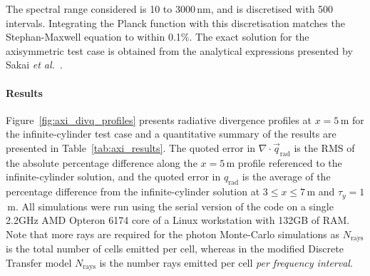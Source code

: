 The spectral range considered is 10 to 3000\,nm, and is discretised with 500 intervals.
Integrating the Planck function with this discretisation matches the Stephan-Maxwell equation to within 0.1\%.
The exact solution for the axisymmetric test case is obtained from the analytical expressions presented by Sakai \textit{et al.}~\cite{SSM1998}.

\paragraph{Results}

Figure~\ref{fig:axi_divq_profiles} presents radiative divergence profiles at $x=5$\,m for the infinite-cylinder test case and a quantitative summary of the results are presented in Table~\ref{tab:axi_results}.
The quoted error in $\nabla \cdot \vec{q}_\text{rad}$ is the RMS of the absolute percentage difference along the $x=5$\,m profile referenced to the infinite-cylinder solution, and the quoted error in $q_\text{rad}$ is the average of the percentage difference from the infinite-cylinder solution at $3 \leq x \leq 7$\,m and $\tau_y=1$\,m.
All simulations were run using the serial version of the code on a single 2.2GHz AMD Opteron 6174 core of a Linux workstation with 132GB of RAM.
Note that more rays are required for the photon Monte-Carlo simulations as $N_\text{rays}$ is the total number of cells emitted per cell, whereas in the modified Discrete Transfer model $N_\text{rays}$ is the number rays emitted per cell \textit{per frequency interval}.

